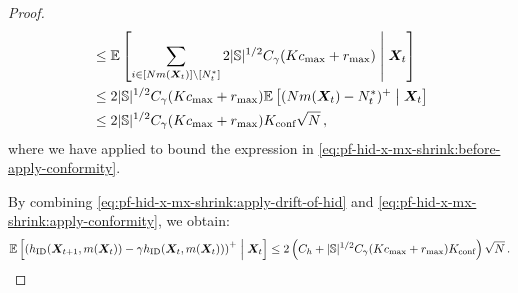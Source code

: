 \begin{proof}
\begin{align}
        \nonumber
        &\leq \mathbb{E}\left[\sum_{i\in[Nm({\bm{X}}_t)]\backslash[N_t^*]}2\lvert\mathbb{S}\rvert^{1/2}C_{\gamma}(Kc_{\max}+r_{\max})\;\middle|\;{\bm{X}}_t\right]\\
        \label{eq:pf-hid-x-mx-shrink:before-apply-conformity}
        &\leq 2\lvert\mathbb{S}\rvert^{1/2}C_{\gamma}(Kc_{\max}+r_{\max}) \mathbb{E}\left[(Nm({\bm{X}}_t)-N_t^*)^+\;\middle|\;{\bm{X}}_t\right]\\
        \label{eq:pf-hid-x-mx-shrink:apply-conformity}
        &\leq 2\lvert\mathbb{S}\rvert^{1/2} C_{\gamma}(Kc_{\max}+r_{\max})K_{\text{conf}}\sqrt{N}\,,
    \end{align}
    where we have applied  to bound the expression in \eqref{eq:pf-hid-x-mx-shrink:before-apply-conformity}.  
    
    By combining \eqref{eq:pf-hid-x-mx-shrink:apply-drift-of-hid} and \eqref{eq:pf-hid-x-mx-shrink:apply-conformity}, we obtain:  
    \begin{align*}
        \mathbb{E}\left[\left(h_{\textnormal{ID}}({\bm{X}}_{t+1},m({\bm{X}}_t))-\gamma h_{\textnormal{ID}}({\bm{X}}_t,m({\bm{X}}_t))\right)^+\;\middle|\;{\bm{X}}_t\right]\leq 2\left(C_h+\lvert\mathbb{S}\rvert^{1/2} C_{\gamma}(Kc_{\max}+r_{\max})K_{\text{conf}}\right)\sqrt{N}\,.
    \end{align*}
\end{proof}


